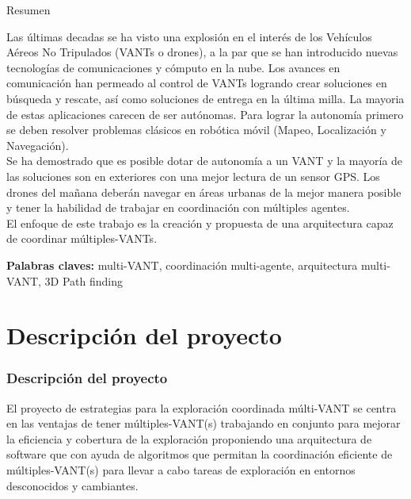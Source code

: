 \documentclass[
	11pt, %
]{beamer}
\begin{document}
\begin{frame}
  
  \begin{block}{Resumen}

    {\footnotesize Las últimas decadas se ha visto una explosión en el interés de los Vehículos Aéreos No Tripulados (VANTs o drones), a la par que se han introducido nuevas tecnologías de comunicaciones y cómputo en la nube. Los avances en comunicación han permeado al control de VANTs logrando crear soluciones en búsqueda y rescate, así como soluciones de entrega en la última milla. La mayoria de estas aplicaciones carecen de ser autónomas. Para lograr la autonomía primero se deben resolver problemas clásicos en robótica móvil (Mapeo, Localización y Navegación).\\
      
    Se ha demostrado que es posible dotar de autonomía a un VANT y la mayoría de las soluciones son en exteriores con una mejor lectura de un sensor GPS. Los drones del mañana deberán navegar en áreas urbanas de la mejor manera posible y tener la habilidad de trabajar en coordinación con múltiples agentes.\\
    
    El enfoque de este trabajo es la creación y propuesta de una arquitectura capaz de coordinar múltiples-VANTs.\\
    }
  \medskip 
  
  \noindent \textbf{Palabras claves:} multi-VANT, coordinación multi-agente, arquitectura multi-VANT, 3D Path finding
  
  \end{block}
  
\end{frame}

\section{Descripción del proyecto}

\begin{frame}
  \frametitle{Descripción del proyecto}

  {\footnotesize
  El proyecto de estrategias para la exploración coordinada múlti-VANT se centra en las ventajas de tener múltiples-VANT(s) trabajando en conjunto para mejorar la eficiencia y cobertura de la exploración proponiendo una arquitectura de software que con ayuda de algoritmos que permitan la coordinación eficiente de múltiples-VANT(s) para llevar a cabo tareas de exploración en entornos desconocidos y cambiantes.}
      
\end{frame}
\end{document}
